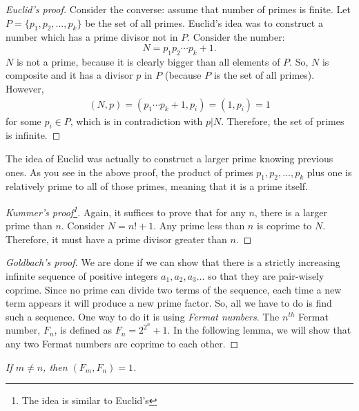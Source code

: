 \documentclass{subfiles}
\begin{document}
	\begin{proof}[Euclid's proof]
		Consider the converse: assume that number of primes is finite. Let $P=\{p_1,p_2,\ldots,p_k\}$ be the set of all primes. Euclid's idea was to construct a number which has a prime divisor not in $P$. Consider the number:
		\[N=p_1p_2\cdots p_k+1.\]
		$N$ is not a prime, because it is clearly bigger than all elements of $P$. So, $N$ is composite and it has a divisor $p$ in $P$ (because $P$ is the set of all primes). However,
		\begin{align}\label{eq:euclidprime}
			(N,p)=(p_1\cdots p_k+1,p_i)=(1,p_i)=1
		\end{align} 
		for some $p_i \in P$, which is in contradiction with $p|N$. Therefore, the set of primes is infinite.
	\end{proof}
	
	\begin{note}
		The idea of Euclid was actually to construct a larger prime knowing previous ones. As you see in the above proof, the product of primes $p_1, p_2, \ldots, p_k$ plus one is relatively prime to all of those primes, meaning that it is a prime itself.
	\end{note}
	
	\begin{proof}[Kummer's proof\footnote{The idea is similar to Euclid's}]
		Again, it suffices to prove that for any $n$, there is a larger prime than $n$. Consider $N=n!+1$. Any prime less than $n$ is coprime to $N$. Therefore, it must have a prime divisor greater than $n$.
	\end{proof}
	
	\begin{proof}[Goldbach's proof]
		We are done if we can show that there is a strictly increasing infinite sequence of positive integers $a_1,a_2,a_3\ldots$ so that they are pair-wisely coprime. Since no prime can divide two terms of the sequence, each time a new term appears it will produce a new prime factor. So, all we have to do is find such a sequence. One way to do it is using \textit{Fermat numbers}. The $n^{th}$ Fermat number, $F_n$, is defined as $F_n=2^{2^n}+1$. In the following lemma, we will show that any two Fermat numbers are coprime to each other.
	\end{proof}
	
	\begin{lemma}\slshape
		If $m\neq n$, then $(F_m,F_n)=1$.\label{lem:fermatcp}
	\end{lemma}
	
\end{document}
